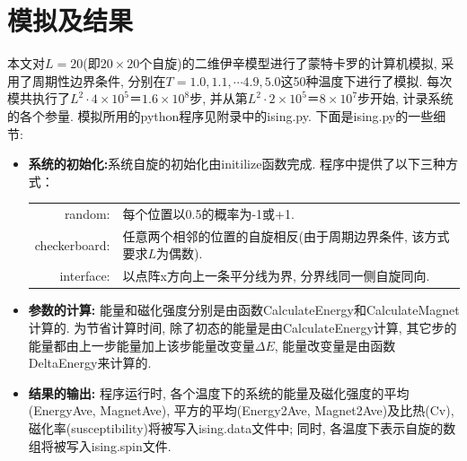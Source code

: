\documentclass[11pt,a4paper,boxed]{caspset}
\begin{document}
\section{模拟及结果}
本文对$L=20$(即$20\times 20$个自旋)的二维伊辛模型进行了蒙特卡罗的计算机模拟, 采用了周期性边界条件, 分别在$T=1.0, 1.1, \cdots 4.9, 5.0$这50种温度下进行了模拟. 每次模共执行了$L^2\cdot4\times 10^5＝1.6\times 10 ^8$步, 并从第$L^2\cdot2\times 10^5＝8\times 10 ^7$步开始, 计录系统的各个参量. 模拟所用的python程序见附录中的ising.py. 下面是ising.py的一些细节:
\begin{itemize}
\item \textbf{系统的初始化:}系统自旋的初始化由initilize函数完成. 程序中提供了以下三种方式：

\begin{tabular}{rl}
  random: &  每个位置以0.5的概率为-1或+1.\\
  checkerboard: & 任意两个相邻的位置的自旋相反(由于周期边界条件, 该方式要求$L$为偶数). \\
  interface: & 以点阵x方向上一条平分线为界, 分界线同一侧自旋同向. \\
\end{tabular}

\item \textbf{参数的计算:} 能量和磁化强度分别是由函数CalculateEnergy和CalculateMagnet计算的. 为节省计算时间, 除了初态的能量是由CalculateEnergy计算, 其它步的能量都由上一步能量加上该步能量改变量$\Delta E$, 能量改变量是由函数DeltaEnergy来计算的.

\item \textbf{结果的输出:} 程序运行时, 各个温度下的系统的能量及磁化强度的平均(EnergyAve, MagnetAve), 平方的平均(Energy2Ave, Magnet2Ave)及比热(Cv), 磁化率(susceptibility)将被写入ising.data文件中; 同时, 各温度下表示自旋的数组将被写入ising.spin文件.
\end{itemize}
\end{document}
